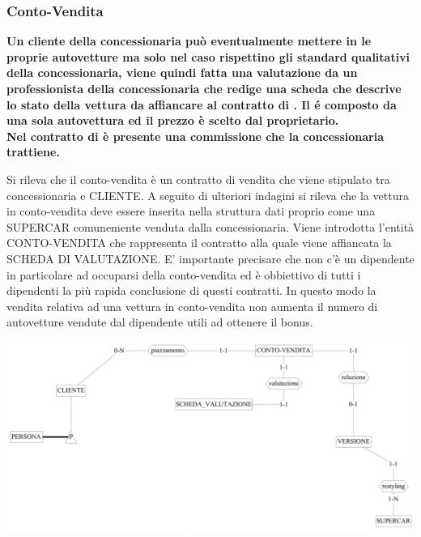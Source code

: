 \documentclass[11pt]{article}
\begin{document}
\subsubsection{Conto-Vendita}
\textbf{Un cliente della concessionaria può eventualmente mettere in
 le proprie autovetture ma solo nel caso rispettino
gli standard qualitativi della concessionaria, viene quindi fatta una
valutazione da un professionista della concessionaria che redige una scheda che
descrive lo stato della vettura da affiancare al contratto di
. Il  é composto da una
sola autovettura ed il prezzo è scelto dal proprietario.\\ 
Nel contratto di  è presente una commissione che la
concessionaria trattiene.}

Si rileva che il conto-vendita è un contratto di vendita che viene stipulato tra
concessionaria e CLIENTE. A seguito di ulteriori indagini si rileva che la
vettura in conto-vendita deve essere inserita nella struttura dati proprio come
una SUPERCAR comunemente venduta dalla concessionaria. Viene introdotta l'entità
CONTO-VENDITA che rappresenta il contratto alla quale viene affiancata la SCHEDA
DI VALUTAZIONE. E' importante precisare che non c’è un dipendente in particolare
ad occuparsi della conto-vendita ed è obbiettivo di tutti i dipendenti la più
rapida conclusione di questi contratti. In questo modo la vendita relativa ad
una vettura in conto-vendita non aumenta il numero di autovetture vendute dal
dipendente utili ad ottenere il bonus.

\begin{center}
    \includegraphics[width=\linewidth]{images/partialSchemes/contoVendita.png}
\end{center}

\newpage

\end{document}
